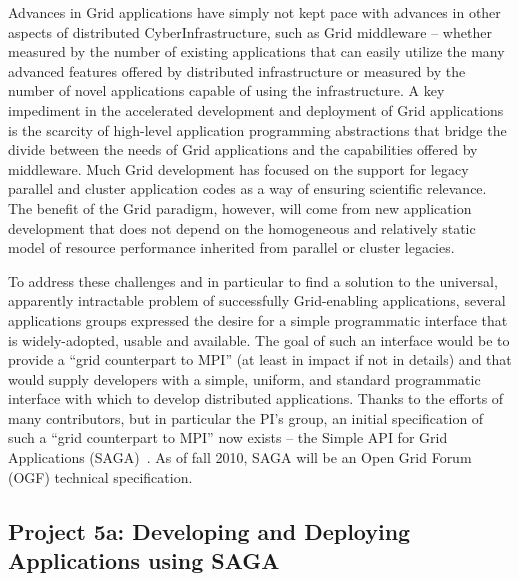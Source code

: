 \documentclass[a4paper,10pt]{article}
\begin{document}

Advances in Grid applications have simply not kept pace with advances in other aspects of distributed CyberInfrastructure, such as Grid middleware -- whether measured by the number of existing applications that can easily utilize the many advanced features offered by distributed infrastructure or measured by the number of novel applications capable of using the infrastructure. A key impediment in the accelerated development and deployment of Grid applications is the scarcity of high-level application programming abstractions that bridge the divide between the needs of Grid applications and the capabilities offered by middleware.  Much Grid development has focused on the support for legacy parallel and cluster application codes as a way of ensuring scientific relevance.  The benefit of the Grid paradigm, however, will come from new application development that does not depend on the homogeneous and relatively static model of resource performance inherited from parallel or cluster legacies.  %

To address these challenges and in particular to find a solution to the universal, apparently intractable problem of successfully Grid-enabling applications, several applications groups expressed the desire for a simple programmatic interface that is widely-adopted, usable and available.  The goal of such an interface would be to provide a ``grid counterpart to MPI'' (at least in impact if not in details) and that would supply developers with a simple, uniform, and standard programmatic interface with which to develop distributed applications.  Thanks to the efforts of many contributors, but in particular the PI's group, an initial specification of such a ``grid counterpart to MPI'' now exists -- the Simple API for Grid Applications (SAGA)~\cite{saga_url}. As of fall 2010, SAGA will be an Open Grid Forum (OGF) technical specification.

\subsection*{Project 5a: Developing and Deploying Applications using SAGA}
\end{document}
